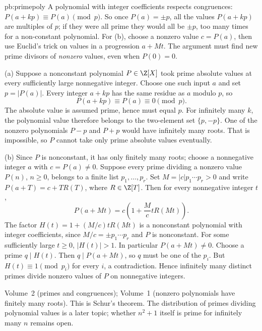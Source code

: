 \begin{solution}{pb:primepoly}
\idea A polynomial with integer coefficients respects congruences: $P(a+kp)\equiv P(a)\pmod p$. So once $P(a)=\pm p$, all the
values $P(a+kp)$ are multiples of $p$; if they were all prime they would all be $\pm p$, too many times for a non-constant
polynomial. For (b), choose a nonzero value $c=P(a)$, then use Euclid's trick on values in a progression $a+Mt$. The argument must find new prime divisors of \emph{nonzero} values, even when $P(0)=0$.

\writeup (a) Suppose a nonconstant polynomial $P\in\Z[X]$ took prime absolute values at every sufficiently large nonnegative integer. Choose one such input $a$ and set $p=|P(a)|$. Every integer $a+kp$ has the same residue as $a$ modulo $p$, so
\[
P(a+kp)\equiv P(a)\equiv0\pmod p.
\]
The absolute value is assumed prime, hence must equal $p$. For infinitely many $k$, the polynomial value therefore belongs to the two-element set $\{p,-p\}$. One of the nonzero polynomials $P-p$ and $P+p$ would have infinitely many roots. That is impossible, so $P$ cannot take only prime absolute values eventually.

(b) Since $P$ is nonconstant, it has only finitely many roots; choose a nonnegative integer $a$ with $c=P(a)\ne0$. Suppose every prime dividing a nonzero value $P(n)$, $n\ge0$, belongs to a finite list $p_1,\ldots,p_r$. Set $M=|c|p_1\cdots p_r>0$ and write $P(a+T)=c+TR(T)$, where $R\in\Z[T]$. Then for every nonnegative integer $t$,
\[
P(a+Mt)=c\left(1+\frac{M}{c}tR(Mt)\right).
\]
The factor $H(t)=1+(M/c)tR(Mt)$ is a nonconstant polynomial with integer coefficients, since $M/c=\pm p_1\cdots p_r$ and $P$ is nonconstant. For some sufficiently large $t\ge0$, $|H(t)|>1$. In particular $P(a+Mt)\ne0$. Choose a prime $q\mid H(t)$. Then $q\mid P(a+Mt)$, so $q$ must be one of the $p_i$. But $H(t)\equiv1\pmod{p_i}$ for every $i$, a contradiction. Hence infinitely many distinct primes divide nonzero values of $P$ on nonnegative integers.

\tools Volume~2 (primes and congruences); Volume~1 (nonzero polynomials have finitely many roots).
\leads This is Schur's theorem. The distribution of primes dividing polynomial values is a later topic; whether $n^2+1$ itself is prime for infinitely many $n$ remains open.
\end{solution}

